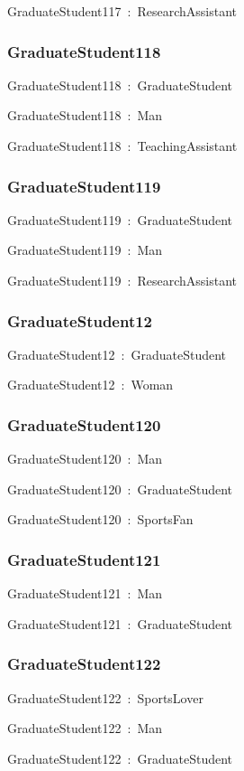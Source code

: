 \documentclass{article}
\begin{document}
GraduateStudent117~:~ResearchAssistant

\subsubsection*{GraduateStudent118}

GraduateStudent118~:~GraduateStudent

GraduateStudent118~:~Man

GraduateStudent118~:~TeachingAssistant

\subsubsection*{GraduateStudent119}

GraduateStudent119~:~GraduateStudent

GraduateStudent119~:~Man

GraduateStudent119~:~ResearchAssistant

\subsubsection*{GraduateStudent12}

GraduateStudent12~:~GraduateStudent

GraduateStudent12~:~Woman

\subsubsection*{GraduateStudent120}

GraduateStudent120~:~Man

GraduateStudent120~:~GraduateStudent

GraduateStudent120~:~SportsFan

\subsubsection*{GraduateStudent121}

GraduateStudent121~:~Man

GraduateStudent121~:~GraduateStudent

\subsubsection*{GraduateStudent122}

GraduateStudent122~:~SportsLover

GraduateStudent122~:~Man

GraduateStudent122~:~GraduateStudent
\end{document}
